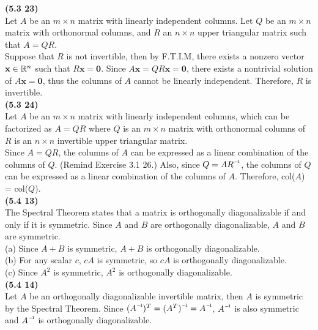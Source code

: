 \textbf{(5.3 23)} \\
Let $A$ be an $m \times n$ matrix with linearly independent columns. Let $Q$ be an $m \times n$ matrix with orthonormal columns, and $R$ an $n \times n$ upper triangular matrix such that $A = QR$. \\

Suppose that $R$ is not invertible, then by F.T.I.M, there exists a nonzero vector $\textbf{x} \in \mathbb{R}^{n}$ such that $R\textbf{x} = \textbf{0}$. Since $A\textbf{x} = QR\textbf{x} = \textbf{0}$, there exists a nontrivial solution of $A\textbf{x} = \textbf{0}$, thus the columns of $A$ cannot be linearly independent. Therefore, $R$ is invertible. \\

\textbf{(5.3 24)} \\
Let $A$ be an $m \times n$ matrix with linearly independent columns, which can be factorized as $A = QR$ where $Q$ is an $m \times n$ matrix with orthonormal columns of $R$ is an $n \times n$ invertible upper triangular matrix. \\

Since $A = QR$, the columns of $A$ can be expressed as a linear combination of the columns of $Q$. (Remind Exercise 3.1 26.) Also, since $Q = A\inv{R}$, the columns of $Q$ can be expressed as a linear combination of the columns of $A$. Therefore, col($A$) = col($Q$). \\

\textbf{(5.4 13)} \\
The Spectral Theorem states that a matrix is orthogonally diagonalizable if and only if it is symmetric. Since $A$ and $B$ are orthogonally diagonalizable, $A$ and $B$ are symmetric. \\

(a) Since $A + B$ is symmetric, $A+B$ is orthogonally diagonalizable. \\

(b) For any scalar $c$, $cA$ is symmetric, so $cA$ is orthogonally diagonalizable. \\

(c) Since $A^2$ is symmetric, $A^2$ is orthogonally diagonalizable. \\

\textbf{(5.4 14)} \\
Let $A$ be an orthogonally diagonalizable invertible matrix, then $A$ is symmetric by the Spectral Theorem. Since $(\inv{A})^T = \inv{(A^T)} = \inv{A}$, $\inv{A}$ is also symmetric and $\inv{A}$ is orthogonally diagonalizable. \\

